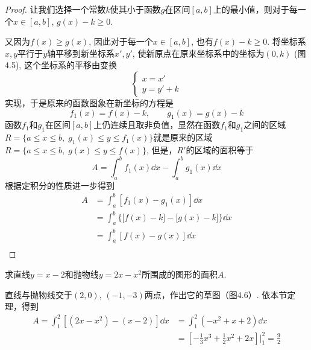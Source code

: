 \begin{proof}
让我们选择一个常数$k$使其小于函数$g$在区间$[a,b]$上的最小值，则对于每一个$x\in [a,b]$, $g(x)
-k\ge 0$.

又因为$f(x)\ge g(x)$, 因此对于每一个$x\in [a,b]$, 
也有$f(x)-k\ge 0$. 将坐标系$x,y$平行于$y$轴平移到新坐标系$x',y'$, 使新原点在原来坐标系中的坐标为$(0,k)$ (图4.5), 这个坐标系的平移由变换
\[\begin{cases}
    x=x'\\
    y=y'+k
\end{cases}\]
实现，于是原来的函数图象在新坐标的方程是
\[f_1 (x) =f (x) -k,\qquad g_1 (x) =g (x) -k\]
函数$f_1$和$g_1$在区间$[a,b]$上仍连续且取非负值，显然在函数$f_1$和$g_1$之间的区域$R=\{a\le x\le b,\; g_1(x)\le y\le f_1(x)\}$就是原来的区域$R=\{a\le x\le b,\; g(x)\le y\le f(x)\}$, 但是，$R'$的区域的面积等于
\[A=\int^b_a f_1(x)\dd x-\int^b_a g_1(x)\dd x\]
根据定积分的性质进一步得到
\[\begin{split}
    A&=\int^b_a [f_1(x)-g_1(x)]\dd x\\
    &=\int^b_a \Big\{\big[f(x)-k\big]-\big[g(x)-k\big]\Big\}\dd x\\
    &=\int^b_a [f(x)-g(x)]\dd x\\
\end{split}\]
\end{proof}

\begin{example}
求直线$y=x-2$和抛物线$y=2x-x^2$所围成的图形的面积$A$.
\end{example}

\begin{solution}
直线与抛物线交于$(2, 0)$, $(-1,-3)$两点，作出它的草图（图4.6）. 依本节定理，得到
\[\begin{split}
    A=\int^2_1 [(2x-x^2)-(x-2)]\dd x
    &=\int^2_1 (-x^2+x+2)\dd x\\
    &=\left[-\frac{1}{3}x^3+\frac{1}{2}x^2+2x\right]\Bigg|^2_1=\frac{9}{2}
\end{split}\]
\end{solution}


